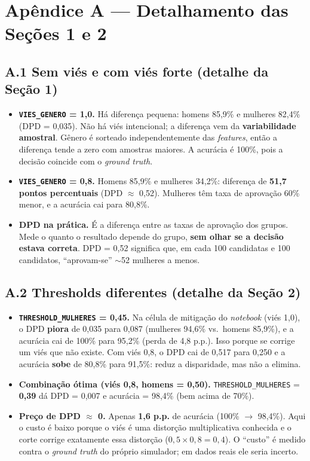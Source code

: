 \documentclass[10pt,a4paper]{article}
\begin{document}
\newpage
\section*{Ap\^endice A --- Detalhamento das Se\c{c}\~oes 1 e 2}
\subsection*{A.1 Sem vi\'es e com vi\'es forte (detalhe da Se\c{c}\~ao 1)}
\begin{itemize}
  \item \textbf{\texttt{VIES\_GENERO} = 1,0.} H\'a diferen\c{c}a pequena: homens 85,9\% e mulheres 82,4\% (DPD = 0,035). N\~ao h\'a vi\'es intencional; a diferen\c{c}a vem da \textbf{variabilidade amostral}. G\^enero \'e sorteado independentemente das \textit{features}, ent\~ao a diferen\c{c}a tende a zero com amostras maiores. A acur\'acia \'e 100\%, pois a decis\~ao coincide com o \textit{ground truth}.
  \item \textbf{\texttt{VIES\_GENERO} = 0,8.} Homens 85,9\% e mulheres 34,2\%: diferen\c{c}a de \textbf{51,7 pontos percentuais} (DPD $\approx$ 0,52). Mulheres t\^em taxa de aprova\c{c}\~ao 60\% menor, e a acur\'acia cai para 80,8\%.
  \item \textbf{DPD na pr\'atica.} \'E a diferen\c{c}a entre as taxas de aprova\c{c}\~ao dos grupos. Mede o quanto o resultado depende do grupo, \textbf{sem olhar se a decis\~ao estava correta}. DPD = 0,52 significa que, em cada 100 candidatas e 100 candidatos, ``aprovam-se'' $\sim$52 mulheres a menos.
\end{itemize}

\subsection*{A.2 Thresholds diferentes (detalhe da Se\c{c}\~ao 2)}
\begin{itemize}
  \item \textbf{\texttt{THRESHOLD\_MULHERES} = 0,45.} Na c\'elula de mitiga\c{c}\~ao do \textit{notebook} (vi\'es 1,0), o DPD \textbf{piora} de 0,035 para 0,087 (mulheres 94,6\% vs.\ homens 85,9\%), e a acur\'acia cai de 100\% para 95,2\% (perda de 4,8 p.p.). Isso porque se corrige um vi\'es que n\~ao existe. Com vi\'es 0,8, o DPD cai de 0,517 para 0,250 e a acur\'acia \textbf{sobe} de 80,8\% para 91,5\%: reduz a disparidade, mas n\~ao a elimina.
  \item \textbf{Combina\c{c}\~ao \'otima (vi\'es 0,8, homens = 0,50).} \texttt{THRESHOLD\_MULHERES} = \textbf{0,39} d\'a DPD = 0,007 e acur\'acia = 98,4\% (bem acima de 70\%).
  \item \textbf{Pre\c{c}o de DPD $\approx$ 0.} Apenas \textbf{1,6 p.p.} de acur\'acia (100\% $\to$ 98,4\%). Aqui o custo \'e baixo porque o vi\'es \'e uma distor\c{c}\~ao multiplicativa conhecida e o corte corrige exatamente essa distor\c{c}\~ao ($0{,}5\times 0{,}8 = 0{,}4$). O ``custo'' \'e medido contra o \textit{ground truth} do pr\'oprio simulador; em dados reais ele seria incerto.
\end{itemize}
\end{document}
